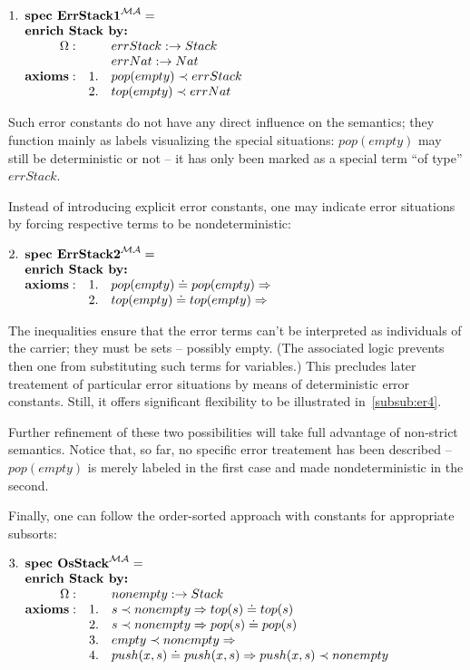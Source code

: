\documentclass[10pt]{article}
\begin{document}
\(
1. \spec{	\tit{\mbox{\bf spec\ ErrStack1}^{\inst{MA}}=} \\
	\tit{\mbox{\bf enrich\ Stack\  by:}} \\
	    	\Ops:	&& errStack: \to Stack\\
		        && errNat: \to Nat \\
	 	{\bf axioms:}
			&1.& pop(empty) \prec errStack\\
			&2.& top(empty) \prec errNat
}
\) 

\noindent
Such error constants do not have any
direct influence on the semantics; they function mainly as labels visualizing
the special situations:
$pop(empty)$ may still be deterministic or not -- it has only been marked as a
special term ``of type'' $errStack$. 

Instead of introducing explicit error constants, one may indicate error
situations by forcing respective terms to be nondeterministic:
\vspace*{1ex}

\(
2. \spec{	\tit{\mbox{\bf spec\ ErrStack2}^{\inst{MA}}=} \\
	\tit{\mbox{\bf enrich\ Stack\  by:}} \\
	 	{\bf axioms:}
			&1.& pop(empty) \eleq pop(empty) \To\\
			&2.& top(empty) \eleq top(empty) \To
}
\)  

\noindent
The inequalities ensure that the error terms can't be interpreted as
individuals of the carrier; they must be sets -- possibly empty. (The
associated logic prevents then one from substituting such terms for
variables.) This precludes later treatement of particular error
situations by means of deterministic error constants.  Still, it offers
significant flexibility to be illustrated
in~\ref{subsub:er4}.

Further refinement of these two possibilities will take full advantage of
non-strict semantics. Notice that, so far, no specific error treatement has
been described -- $pop(empty)$ is merely
labeled in the first case and made nondeterministic in the second.

Finally, one can follow the order-sorted approach with constants for
appropriate subsorts:
\vspace*{1ex}

\( 
3. \spec{
	\tit{\mbox{\bf spec\ OsStack}^{\inst{MA}}=} \\
	\tit{\mbox{\bf enrich\ Stack\  by:}} \\
	    	\Ops:	&& nonempty: \to Stack\\
	 	{\bf axioms:}
			&1.& s \prec nonempty \To top(s) \eleq top(s)\\
			&2.& s \prec nonempty \To pop(s) \eleq pop(s)\\
			&3.& empty \prec nonempty \To	\\
			&4.& push(x,s)\eleq push(x,s) \To push(x,s)\prec nonempty
}
\)
\end{document}
